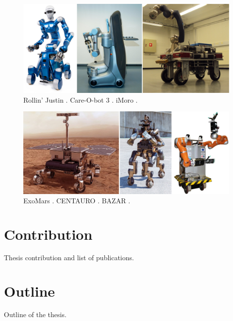 \begin{figure}
    \centering
    \includegraphics[width=\textwidth]{figures/01-introduction/SWMRs-1.jpg}
    \caption{Rollin' Justin \cite{Fuchs2009RollinJustin}.
        Care-O-bot 3 \cite{Graf2009Care-O-bot3}.
        iMoro \cite{Oftadeh2013iMoro}.}
    \label{fig:introduction:SWMRs-1}
\end{figure}

\begin{figure}
    \centering
    \includegraphics[width=\textwidth]{figures/01-introduction/SWMRs-2.jpg}
    \caption{ExoMars \cite{Poulakis2015ExoMarsMobilitySubsystem}.
        CENTAURO \cite{Kashiri2019Centauro}.
        BAZAR \cite{Cherubini2019ACR}.
    }
    \label{fig:introduction:SWMRs-2}
\end{figure}


\section{Contribution}
Thesis contribution and list of publications.

\section{Outline}
Outline of the thesis.

